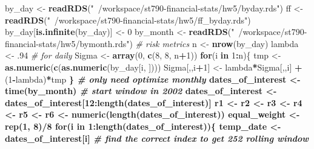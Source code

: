 \documentclass[11pt,]{article}
\newenvironment{Shaded}{\begin{snugshade}}{\end{snugshade}}
\newcommand{\CommentTok}[1]{\textcolor[rgb]{0.56,0.35,0.01}{\textit{#1}}}
\newcommand{\ControlFlowTok}[1]{\textcolor[rgb]{0.13,0.29,0.53}{\textbf{#1}}}
\newcommand{\DecValTok}[1]{\textcolor[rgb]{0.00,0.00,0.81}{#1}}
\newcommand{\FloatTok}[1]{\textcolor[rgb]{0.00,0.00,0.81}{#1}}
\newcommand{\KeywordTok}[1]{\textcolor[rgb]{0.13,0.29,0.53}{\textbf{#1}}}
\newcommand{\NormalTok}[1]{#1}
\newcommand{\OperatorTok}[1]{\textcolor[rgb]{0.81,0.36,0.00}{\textbf{#1}}}
\newcommand{\StringTok}[1]{\textcolor[rgb]{0.31,0.60,0.02}{#1}}
\begin{document}
\begin{Shaded}
\begin{Highlighting}[]
\NormalTok{by_day <-}\StringTok{ }\KeywordTok{readRDS}\NormalTok{(}\StringTok{"~/workspace/st790-financial-stats/hw5/byday.rds"}\NormalTok{) }
\NormalTok{ff <-}\StringTok{ }\KeywordTok{readRDS}\NormalTok{(}\StringTok{"~/workspace/st790-financial-stats/hw5/ff_byday.rds"}\NormalTok{)}
\NormalTok{by_day[}\KeywordTok{is.infinite}\NormalTok{(by_day)] <-}\StringTok{ }\DecValTok{0}
\NormalTok{by_month <-}\StringTok{ }\KeywordTok{readRDS}\NormalTok{(}\StringTok{"~/workspace/st790-financial-stats/hw5/bymonth.rds"}\NormalTok{)}
\CommentTok{# risk metrics }
\NormalTok{n <-}\StringTok{ }\KeywordTok{nrow}\NormalTok{(by_day) }
\NormalTok{lambda <-}\StringTok{ }\FloatTok{.94} \CommentTok{# for daily }
\NormalTok{Sigma <-}\StringTok{ }\KeywordTok{array}\NormalTok{(}\DecValTok{0}\NormalTok{, }\KeywordTok{c}\NormalTok{(}\DecValTok{8}\NormalTok{, }\DecValTok{8}\NormalTok{, n}\OperatorTok{+}\DecValTok{1}\NormalTok{))}
\ControlFlowTok{for}\NormalTok{(i }\ControlFlowTok{in} \DecValTok{1}\OperatorTok{:}\NormalTok{n)\{}
\NormalTok{  tmp <-}\StringTok{ }\KeywordTok{as.numeric}\NormalTok{(}\KeywordTok{c}\NormalTok{(}\KeywordTok{as.numeric}\NormalTok{(by_day[i, ])))}
\NormalTok{  Sigma[,,i}\OperatorTok{+}\DecValTok{1}\NormalTok{] <-}\StringTok{ }\NormalTok{lambda}\OperatorTok{*}\NormalTok{Sigma[,,i] }\OperatorTok{+}\StringTok{ }\NormalTok{(}\DecValTok{1}\OperatorTok{-}\NormalTok{lambda)}\OperatorTok{*}\NormalTok{tmp }\OperatorTok{%
\NormalTok{\}}
\CommentTok{# only need optimize monthly }
\NormalTok{dates_of_interest <-}\StringTok{ }\KeywordTok{time}\NormalTok{(by_month)}
\CommentTok{# start window in 2002 }
\NormalTok{dates_of_interest <-}\StringTok{ }\NormalTok{dates_of_interest[}\DecValTok{12}\OperatorTok{:}\KeywordTok{length}\NormalTok{(dates_of_interest)]}
\NormalTok{r1 <-}\StringTok{ }\NormalTok{r2 <-}\StringTok{ }\NormalTok{r3 <-}\StringTok{ }\NormalTok{r4 <-}\StringTok{ }\NormalTok{r5 <-}\StringTok{ }\NormalTok{r6 <-}\StringTok{ }\KeywordTok{numeric}\NormalTok{(}\KeywordTok{length}\NormalTok{(dates_of_interest))}
\NormalTok{equal_weight <-}\StringTok{ }\KeywordTok{rep}\NormalTok{(}\DecValTok{1}\NormalTok{, }\DecValTok{8}\NormalTok{)}\OperatorTok{/}\DecValTok{8}
\ControlFlowTok{for}\NormalTok{(i }\ControlFlowTok{in} \DecValTok{1}\OperatorTok{:}\KeywordTok{length}\NormalTok{(dates_of_interest))\{}
\NormalTok{  temp_date <-}\StringTok{ }\NormalTok{dates_of_interest[i]}
  \CommentTok{# find the correct index to get 252 rolling window }
}
\end{Highlighting}
\end{Shaded}
\end{document}
